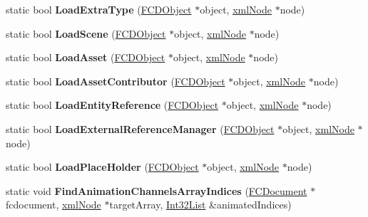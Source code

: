 \begin{DoxyCompactItemize}
\item 
\hypertarget{classFArchiveXML_a42482076998e2198f9a0425ff8dcc6dc}{
static bool {\bfseries LoadExtraType} (\hyperlink{classFCDObject}{FCDObject} $\ast$object, \hyperlink{struct__xmlNode}{xmlNode} $\ast$node)}
\label{classFArchiveXML_a42482076998e2198f9a0425ff8dcc6dc}

\item 
\hypertarget{classFArchiveXML_a5a49f5747b16985482ddc172fc81b734}{
static bool {\bfseries LoadScene} (\hyperlink{classFCDObject}{FCDObject} $\ast$object, \hyperlink{struct__xmlNode}{xmlNode} $\ast$node)}
\label{classFArchiveXML_a5a49f5747b16985482ddc172fc81b734}

\item 
\hypertarget{classFArchiveXML_a875e91a66a9b40641d083af3e8c9fe1b}{
static bool {\bfseries LoadAsset} (\hyperlink{classFCDObject}{FCDObject} $\ast$object, \hyperlink{struct__xmlNode}{xmlNode} $\ast$node)}
\label{classFArchiveXML_a875e91a66a9b40641d083af3e8c9fe1b}

\item 
\hypertarget{classFArchiveXML_a367c11921b7c1537718047064d1e5ffe}{
static bool {\bfseries LoadAssetContributor} (\hyperlink{classFCDObject}{FCDObject} $\ast$object, \hyperlink{struct__xmlNode}{xmlNode} $\ast$node)}
\label{classFArchiveXML_a367c11921b7c1537718047064d1e5ffe}

\item 
\hypertarget{classFArchiveXML_a8cadc7aba5cbef80ba1e0a05d566abdd}{
static bool {\bfseries LoadEntityReference} (\hyperlink{classFCDObject}{FCDObject} $\ast$object, \hyperlink{struct__xmlNode}{xmlNode} $\ast$node)}
\label{classFArchiveXML_a8cadc7aba5cbef80ba1e0a05d566abdd}

\item 
\hypertarget{classFArchiveXML_a957566c1300a2ab443077fb3cc554387}{
static bool {\bfseries LoadExternalReferenceManager} (\hyperlink{classFCDObject}{FCDObject} $\ast$object, \hyperlink{struct__xmlNode}{xmlNode} $\ast$node)}
\label{classFArchiveXML_a957566c1300a2ab443077fb3cc554387}

\item 
\hypertarget{classFArchiveXML_a6f9aa794147a5c59286711fe7245586a}{
static bool {\bfseries LoadPlaceHolder} (\hyperlink{classFCDObject}{FCDObject} $\ast$object, \hyperlink{struct__xmlNode}{xmlNode} $\ast$node)}
\label{classFArchiveXML_a6f9aa794147a5c59286711fe7245586a}

\item 
\hypertarget{classFArchiveXML_aad15689fbfca61712581151d2acb598e}{
static void {\bfseries FindAnimationChannelsArrayIndices} (\hyperlink{classFCDocument}{FCDocument} $\ast$fcdocument, \hyperlink{struct__xmlNode}{xmlNode} $\ast$targetArray, \hyperlink{classfm_1_1vector}{Int32List} \&animatedIndices)}
\label{classFArchiveXML_aad15689fbfca61712581151d2acb598e}


\end{DoxyCompactItemize}
